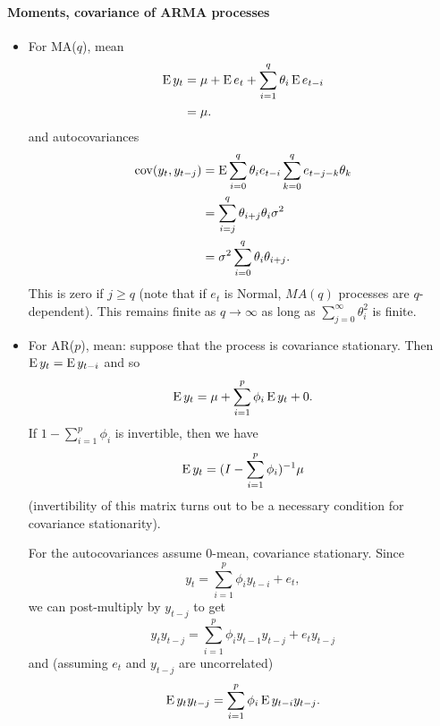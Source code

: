 \paragraph{Moments, covariance of ARMA processes}

\begin{itemize}
\item For MA($q$), mean
  \begin{align*}
    \operatorname{E} y_t &= \mu + \operatorname{E} e_t + \sum_{i=1}^q \theta_i \operatorname{E} e_{t-i} \\
    &= \mu.
  \end{align*}
  and autocovariances
  \begin{align*}
    \operatorname{cov}( y_t, y_{t-j}) &= \operatorname{E} \sum_{i=0}^q \theta_i e_{t-i} \sum_{k=0}^q e_{t-j-k} \theta_k\\
    &= \sum_{i=j}^q \theta_{i+j} \theta_i \sigma^2 \\
    &= \sigma^2 \sum_{i=0}^q \theta_i \theta_{i+j}.
  \end{align*}
  This is zero if $j \geq q$ (note that if $e_t$ is Normal, $MA(q)$
  processes are $q$-dependent). This remains finite as $q \to \infty$
  as long as $\sum_{j=0}^\infty \theta_i^2$ is finite.
\item For AR($p$), mean: suppose that the process is covariance
  stationary. Then $\operatorname{E} y_t = \operatorname{E} y_{t-i}$ and so
  \begin{equation*}
    \operatorname{E} y_t = \mu + \sum_{i=1}^p \phi_i \operatorname{E} y_t + 0.
  \end{equation*}
  If $1 - \sum_{i=1}^p \phi_i$ is invertible, then we have
  \begin{equation*}
    \operatorname{E} y_t = (I - \sum_{i=1}^p \phi_i )^{-1} \mu
  \end{equation*}
  (invertibility of this matrix turns out to be a necessary condition
  for covariance stationarity).

  For the autocovariances assume 0-mean, covariance stationary. Since
  \begin{equation*}
    y_t = \sum_{i=1}^p \phi_i y_{t-i} + e_t,
  \end{equation*}
  we can post-multiply by $y_{t-j}$ to get
  \begin{equation*}
    y_t y_{t-j} = \sum_{i=1}^p \phi_i y_{t-1} y_{t-j} + e_t y_{t-j}
  \end{equation*}
  and (assuming $e_t$ and $y_{t-j}$ are uncorrelated)
  \begin{equation*}
    \operatorname{E} y_t y_{t-j} = \sum_{i=1}^p \phi_i \operatorname{E} y_{t-i} y_{t-j}.
  \end{equation*}


\end{itemize}
